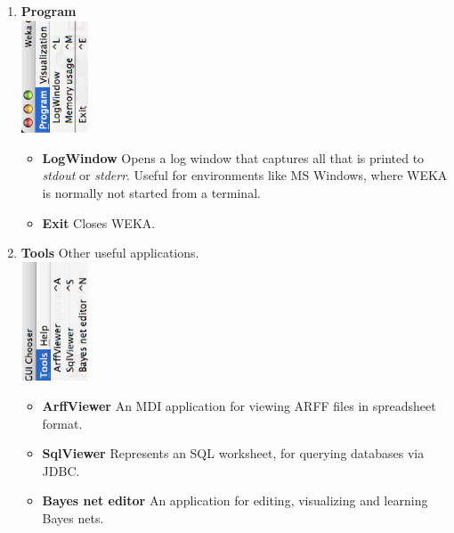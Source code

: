 \begin{enumerate}
	\item \textbf{Program} \\
	        \includegraphics[angle=270,width=2cm]{images/launching/guic_program.eps}
		\begin{itemize}
			\item \textbf{LogWindow} Opens a log window that captures all that is printed to \textit{stdout} or \textit{stderr}. Useful for environments like MS Windows, where WEKA is normally not started from a terminal.
			\item \textbf{Exit} Closes WEKA.
		\end{itemize}
				
	\item \textbf{Tools} Other useful applications. \\
                \includegraphics[angle=270,width=2cm]{images/launching/guic_tools.eps}
		\begin{itemize}
			\item \textbf{ArffViewer} An MDI application for viewing ARFF files in spreadsheet format.
			\item \textbf{SqlViewer} Represents an SQL worksheet, for querying databases via JDBC.
                        \item \textbf{Bayes net editor} An application for editing, visualizing and learning Bayes nets.
		\end{itemize}
		

\end{enumerate}
